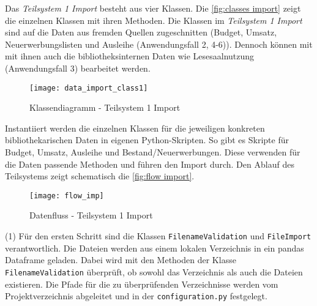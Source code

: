     Das \textit{Teilsystem 1 Import} besteht aus vier Klassen. Die \autoref{fig:classes import} zeigt die einzelnen Klassen mit ihren Methoden.
    Die Klassen im \textit{Teilsystem 1 Import} sind auf die Daten aus fremden Quellen zugeschnitten
    (Budget, Umsatz, Neuerwerbungslisten und Ausleihe (Anwendungsfall 2, 4-6)). Dennoch können mit mit ihnen auch die bibliotheksinternen Daten
    wie Lesesaalnutzung (Anwendungsfall 3) bearbeitet werden. 
    \begin{figure}[H]
        \centering
            \texttt{[image: data\_import\_class1]}
            \caption{Klassendiagramm - Teilsystem 1 Import}
            \label{fig:classes import}
    \end{figure}

    Instantiiert werden die einzelnen Klassen für die jeweiligen konkreten bibliothekarischen Daten in eigenen Python-Skripten. 
    So gibt es Skripte für Budget, Umsatz, Ausleihe und Bestand/Neuerwerbungen. Diese verwenden für die Daten passende Methoden
    und führen den Import durch.
    Den Ablauf des Teilsystems zeigt schematisch die \autoref{fig:flow import}.

    \begin{figure}[H]
        \centering
            \texttt{[image: flow\_imp]}
            \caption{Datenfluss - Teilsystem 1 Import}
            \label{fig:flow import}
    \end{figure}

    
    (1) Für den ersten Schritt sind die Klassen \texttt{FilenameValidation} und \texttt{FileImport} verantwortlich.
    Die Dateien werden aus einem lokalen Verzeichnis in ein pandas Dataframe geladen. 
    Dabei wird mit den Methoden der Klasse \texttt{FilenameValidation} überprüft, ob sowohl das Verzeichnis als auch die Dateien existieren.
    Die Pfade für die zu überprüfenden Verzeichnisse werden vom Projektverzeichnis abgeleitet und in der \texttt{configuration.py} festgelegt.
    
